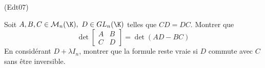 \begin{tiny}(Edt07)\end{tiny}
Soit $A,B,C\in \mathcal{M}_{n}(\K),$ $D\in GL_{n}(\K)$
telles que $CD=DC$. Montrer que 
\begin{displaymath}
\det  \begin{bmatrix} A & B \\ C & D \end{bmatrix} =\det (AD-BC)
\end{displaymath}
En considérant $D+\lambda I_n$, montrer que la formule reste vraie si $D$ commute avec $C$ sans être inversible.